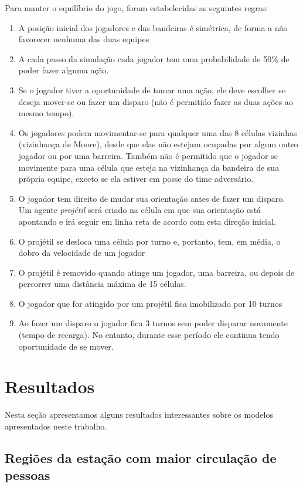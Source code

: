 \documentclass[preprint,12pt]{elsarticle}
\begin{document}
Para manter o equilíbrio do jogo, foram estabelecidas as seguintes regras:

\begin{enumerate}
	\setlength\itemsep{0em}
	\item A posição inicial dos jogadores e das bandeiras é simétrica, de forma a não favorecer nenhuma das duas equipes
	\item A cada passo da simulação cada jogador tem uma probabilidade de 50\% de poder fazer alguma ação.
	\item Se o jogador tiver a oportunidade de tomar uma ação, ele deve escolher se deseja mover-se ou fazer um disparo (não é permitido fazer as duas ações ao mesmo tempo).
	\item Os jogadores podem movimentar-se para qualquer uma das 8 células vizinhas (vizinhança de Moore), desde que elas não estejam ocupadas por algum outro jogador ou por uma barreira. Também não é permitido que o jogador se movimente para uma célula que esteja na vizinhança da bandeira de sua própria equipe, exceto se ela estiver em posse do time adversário.
	\item O jogador tem direito de mudar sua orientação antes de fazer um disparo. Um agente \textit{projétil} será criado na célula em que sua orientação está apontando e irá seguir em linha reta de acordo com esta direção inicial.
	\item O projétil se desloca uma célula por turno e, portanto, tem, em média, o dobro da velocidade de um jogador
	\item O projétil é removido quando atinge um jogador, uma barreira, ou depois de percorrer uma distância máxima de 15 células.	
	\item O jogador que for atingido por um projétil fica imobilizado por 10 turnos
	\item Ao fazer um disparo o jogador fica 3 turnos sem poder disparar novamente (tempo de recarga). No entanto, durante esse período ele continua tendo oportunidade de se mover.
\end{enumerate}

\section{Resultados}
\label{sec:resultados}

Nesta seção apresentamos alguns resultados interessantes sobre os modelos apresentados neste trabalho.

\subsection{Regiões da estação com maior circulação de pessoas}
\label{subsec:metro_heatmap}
\end{document}

